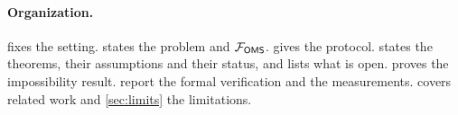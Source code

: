 \paragraph{Organization.}  fixes the setting.  states the problem and $\mathcal{F}_{\mathsf{OMS}}$.  gives the protocol.  states the theorems, their assumptions and their status, and lists what is open.  proves the impossibility result.  report the formal verification and the measurements.  covers related work and \cref{sec:limits} the limitations.
